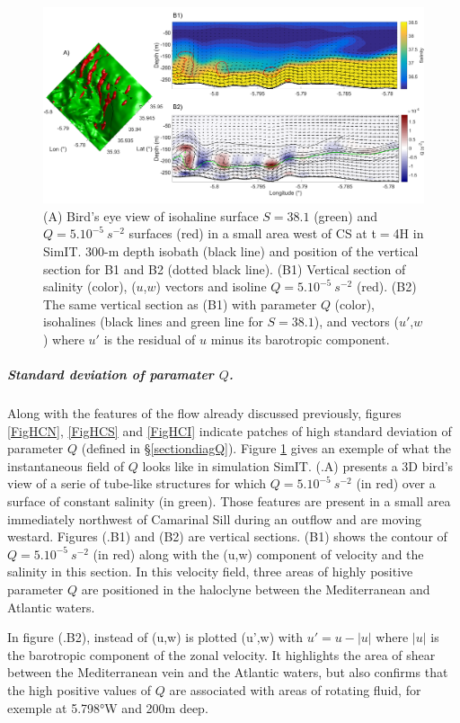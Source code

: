 \begin{figure}[!h]
 \includegraphics[width=\textwidth]{./GBR3D/FigInstaQ_IES4H.png}
 \caption {(A) Bird's eye view of isohaline surface $S=38.1$ (green) and $Q=5.10^{-5} \ s^{-2}$ surfaces (red) in a small area west of CS at t$=$4H in SimIT. 300-m depth isobath (black line) and position of the vertical section for B1 and B2 (dotted black line). (B1) Vertical section of salinity (color), ($u$,$w$) vectors and isoline $Q=5.10^{-5}\ s^{-2}$ (red). (B2) The same vertical section as (B1) with parameter $Q$ (color), isohalines (black lines and green line for $S=38.1$), and vectors ($u'$,$w$) where $u'$ is the residual of $u$ minus its barotropic component.}
 \label{FigInstaEx}
\end{figure}

\subparagraph{Standard deviation of paramater $Q$.}
Along with the features of the flow already discussed previously, figures \ref{FigHCN}, \ref{FigHCS} and \ref{FigHCI} indicate patches of high standard deviation of parameter $Q$ (defined in \S \ref{sectiondiagQ}). Figure \ref{FigInstaEx} gives an exemple of what the instantaneous field of $Q$ looks like in simulation SimIT. (.A) presents a 3D bird's view of a serie of tube-like structures for which $Q=5.10^{-5} \ s^{-2}$ (in red) over a surface of constant salinity (in green). Those features are present in a small area immediately northwest of Camarinal Sill during an outflow and are moving westard. Figures (.B1) and (B2) are vertical sections. (B1) shows the contour of $Q=5.10^{-5} \ s^{-2}$ (in red) along with the (u,w) component of velocity and the salinity in this section. In this velocity field, three areas of highly positive parameter $Q$ are positioned in the haloclyne between the Mediterranean and Atlantic waters.

In figure (.B2), instead of (u,w) is plotted (u',w) with $u'=u-|u|$ where $|u|$ is the barotropic component of the zonal velocity. It highlights the area of shear between the Mediterranean vein and the Atlantic waters, but also confirms that the high positive values of $Q$ are associated with areas of rotating fluid, for exemple at 5.798°W and 200m deep. 

